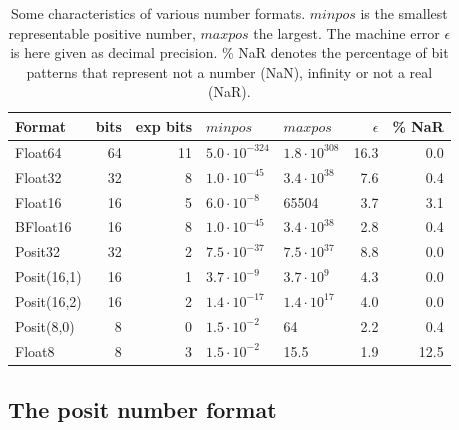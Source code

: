\documentclass[draft]{agujournal2019}
\begin{document}
\begin{table}[htbp]
\center
\begin{tabular}{l | r | r | l | l | r | r}
Format & bits & exp bits & $minpos$ & $maxpos$ & $\epsilon$ &  \% NaR \\
\hline
Float64	& 64 & 11 & $5.0 \cdot 10^{-324}$ & $1.8 \cdot 10^{308}$  & 16.3 & 0.0 \\
Float32	& 32 & 8 & $1.0 \cdot 10^{-45}$ & $3.4 \cdot 10^{38}$ & 7.6 & 0.4 \\
Float16	& 16 & 5 & $6.0 \cdot 10^{-8}$ & 65504 & 3.7 & 3.1 \\
BFloat16	& 16 & 8 & $ 1.0 \cdot 10^{-45}$ & $3.4 \cdot 10^{38}$ & 2.8 & 0.4  \\
Posit32	& 32 & 2 &  $7.5 \cdot 10^{-37}$ & $7.5 \cdot 10^{37}$ & 8.8 & 0.0 \\
Posit(16,1) & 16 & 1 & $3.7 \cdot 10^{-9}$ & $3.7 \cdot 10^{9}$ & 4.3 & 0.0\\
Posit(16,2) & 16 & 2 & $1.4 \cdot 10^{-17}$ & $1.4 \cdot 10^{17}$ & 4.0 & 0.0\\
Posit(8,0) & 8 & 0 & $1.5 \cdot 10^{-2}$ & 64 & 2.2 & 0.4  \\
Float8 & 8 & 3 & $1.5 \cdot 10^{-2}$ & 15.5 & 1.9 &12.5\\
\end{tabular}
\vspace{10pt}
\caption{Some characteristics of various number formats. $minpos$ is the smallest representable positive number, $maxpos$ the largest. The machine error $\epsilon$ is here given as decimal precision. \% NaR denotes the percentage of bit patterns that represent not a number (NaN), infinity or not a real (NaR).}
\label{tab:formats}
\end{table}

\subsection{The posit number format}
\label{sec:posit_methods}
\end{document}
